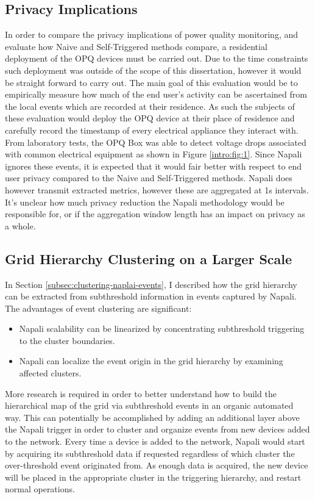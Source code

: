 \subsection{Privacy Implications}\label{subsec:privacy-implications}
In order to compare the privacy implications of power quality monitoring, and evaluate how Naive and Self-Triggered methods compare, a residential deployment of the OPQ devices must be carried out.
Due to the time constraints such deployment was outside of the scope of this dissertation, however it would be straight forward to carry out.
The main goal of this evaluation would be to empirically measure how much of the end user's activity can be ascertained from the local events which are recorded at their residence.
As such the subjects of these evaluation would deploy the OPQ device at their place of residence and carefully record the timestamp of every electrical appliance they interact with.
From laboratory tests, the OPQ Box was able to detect voltage drops associated with common electrical equipment as shown in Figure \ref{intro:fig:1}.
Since Napali ignores these events, it is expected that it would fair better with respect to end user privacy compared to the Naive and Self-Triggered methods.
Napali does however transmit extracted metrics, however these are aggregated at 1s intervals.
It's unclear how much privacy reduction the Napali methodology would be responsible for, or if the aggregation window length has an impact on privacy as a whole.

\subsection{Grid Hierarchy Clustering on a Larger Scale}\label{subsec:grid-hierarchy-clustering-on-a-larger-scale}
In Section \ref{subsec:clustering-naplai-events}, I described how the grid hierarchy can be extracted from subthreshold information in events captured by Napali.
The advantages of event clustering are significant:
\begin{itemize}
    \item Napali scalability can be linearized by concentrating subthreshold triggering to the cluster boundaries.
    \item Napali can localize the event origin in the grid hierarchy by examining affected clusters.
\end{itemize}

More research is required in order to better understand how to build the hierarchical map of the grid via subthreshold events in an organic automated way.
This can potentially be accomplished by adding an additional layer above the Napali trigger in order to cluster and organize events from new devices added to the network.
Every time a device is added to the network, Napali would start by acquiring its subthreshold data if requested regardless of which cluster the over-threshold event originated from.
As enough data is acquired, the new device will be placed in the appropriate cluster in the triggering hierarchy, and restart normal operations.

